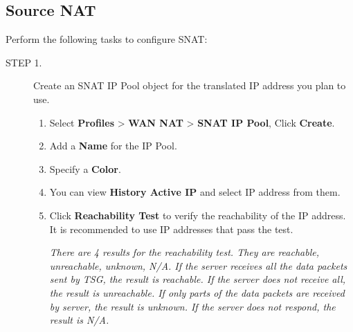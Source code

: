 \subsection*{\hypertarget{link:Source NAT}{Source NAT}}
\label{sec:policies:security:sourcenat}


Perform the following tasks to configure SNAT:


\begin{description}
    \item[STEP 1.]	Create an SNAT IP Pool object for the translated IP address you plan to use.
    \begin{enumerate} 
        \item 	Select \textbf{Profiles} > \textbf{WAN NAT} > \textbf{SNAT IP Pool}, Click \textbf{Create}.  
        \item 	Add a \textbf{Name} for the IP Pool. 
        \item 	Specify a \textbf{Color}.
        \item 	You can view \textbf{History Active IP} and select IP address from them. 
        \item 	Click \textbf{Reachability Test} to verify the reachability of the IP address. It is recommended to use IP addresses that pass the test.
        

        \notemark\textit{There are 4 results for the reachability test. They are reachable, unreachable, unknown, N/A. If the server receives all the data packets sent by TSG,  the result is reachable. If the server does not receive all, the result is unreachable. If only parts of the data packets are received by server, the result is unknown. 
        If the server does not respond, the result is N/A.} 
        

\end{enumerate}
\end{description}

